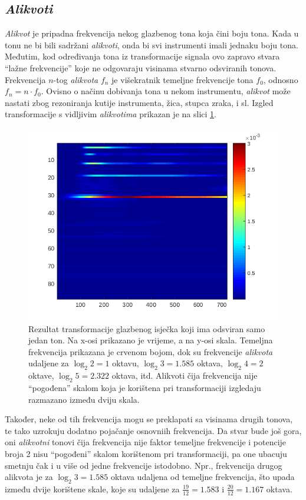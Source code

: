 \documentclass[a4paper, 11pt, twocolumn]{article}
\begin{document}
\subsection{\textit{Alikvoti}}
\label{ss:alikvoti}
\textit{Alikvot} je pripadna frekvencija nekog glazbenog tona koja čini boju tona.
Kada u tonu ne bi bili sadržani \textit{alikvoti}, onda bi svi instrumenti imali jednaku boju tona.
Međutim, kod određivanja tona iz transformacije signala ovo zapravo stvara ``lažne frekvencije'' koje ne odgovaraju visinama stvarno odsviranih tonova.
Frekvencija $n$-tog \textit{alikvota} $f_n$ je višekratnik temeljne frekvencije tona $f_0$, odnosno $f_n = n \cdot f_0$.
Ovisno o načinu dobivanja tona u nekom instrumentu, \textit{alikvot} može nastati zbog rezoniranja kutije instrumenta, žica, stupca zraka, i sl.
Izgled transformacije s vidljivim \textit{alikvotima} prikazan je na slici \ref{fig:alikvoti}.

\begin{figure}[htb]
  \includegraphics[width=\linewidth]{alikvoti}
  \caption{Rezultat transformacije glazbenog isječka koji ima odsviran samo jedan ton. Na x-osi prikazano je vrijeme, a na y-osi skala. Temeljna frekvencija prikazana je crvenom bojom, dok su frekvencije \textit{alikvota} udaljene za $\log_2{2}=1$ oktavu, $\log_2{3}=1.585$ oktava, $\log_2{4}=2$ oktave, $\log_2{5}=2.322$ oktava, itd. Alikvoti čija frekvencija nije ``pogođena'' skalom koja je korištena pri transformaciji izgledaju razmazano između dviju skala.}
  \label{fig:alikvoti}
\end{figure}

Također, neke od tih frekvencija mogu se preklapati sa visinama drugih tonova, te tako uzrokuju dodatno pojačanje osnovniih frekvencija.
Da stvar bude još gora, oni \textit{alikvotni} tonovi čija frekvencija nije faktor temeljne frekvencije i potencije broja 2 nisu ``pogođeni'' skalom korištenom pri transformaciji, pa one ubacuju smetnju čak i u više od jedne frekvencije istodobno.
Npr., frekvencija drugog alikvota je za $\log_2{3}=1.585$ oktava udaljena od temeljne frekvencija, što upada između dvije korištene skale, koje su udaljene za $\frac{19}{12}=1.583$ i $\frac{20}{12}=1.167$ oktava.
\end{document}
